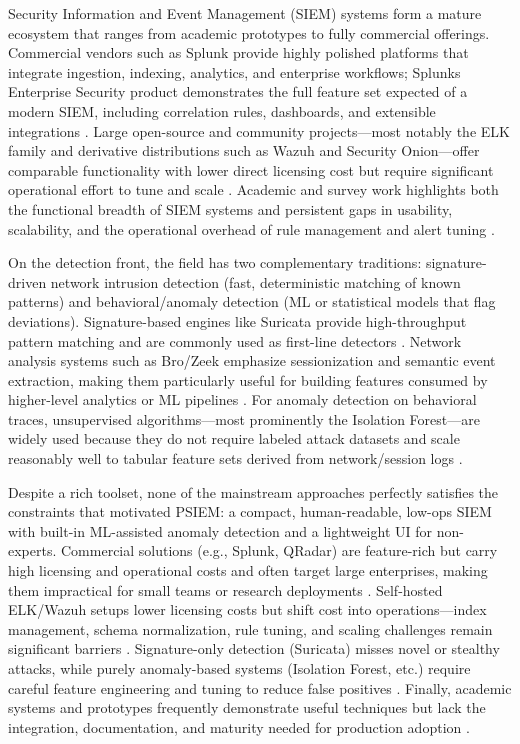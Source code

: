 Security Information and Event Management (SIEM) systems form a mature ecosystem that ranges from academic prototypes to fully commercial offerings. Commercial vendors such as Splunk provide highly polished platforms that integrate ingestion, indexing, analytics, and enterprise workflows; Splunks Enterprise Security product demonstrates the full feature set expected of a modern SIEM, including correlation rules, dashboards, and extensible integrations \cite{Splunk2017}. Large open-source and community projects—most notably the ELK family and derivative distributions such as Wazuh and Security Onion—offer comparable functionality with lower direct licensing cost but require significant operational effort to tune and scale \cite{WazuhWhitepaper2023}. Academic and survey work highlights both the functional breadth of SIEM systems and persistent gaps in usability, scalability, and the operational overhead of rule management and alert tuning \cite{Hase2024}.

On the detection front, the field has two complementary traditions: signature-driven network intrusion detection (fast, deterministic matching of known patterns) and behavioral/anomaly detection (ML or statistical models that flag deviations). Signature-based engines like Suricata provide high-throughput pattern matching and are commonly used as first-line detectors \cite{SuricataPerf2018}. Network analysis systems such as Bro/Zeek emphasize sessionization and semantic event extraction, making them particularly useful for building features consumed by higher-level analytics or ML pipelines \cite{Paxson1999}. For anomaly detection on behavioral traces, unsupervised algorithms—most prominently the Isolation Forest—are widely used because they do not require labeled attack datasets and scale reasonably well to tabular feature sets derived from network/session logs \cite{Liu2008}.

Despite a rich toolset, none of the mainstream approaches perfectly satisfies the constraints that motivated PSIEM: a compact, human-readable, low-ops SIEM with built-in ML-assisted anomaly detection and a lightweight UI for non-experts. Commercial solutions (e.g., Splunk, QRadar) are feature-rich but carry high licensing and operational costs and often target large enterprises, making them impractical for small teams or research deployments \cite{Splunk2017}. Self-hosted ELK/Wazuh setups lower licensing costs but shift cost into operations—index management, schema normalization, rule tuning, and scaling challenges remain significant barriers \cite{WazuhWhitepaper2023, Hase2024}. Signature-only detection (Suricata) misses novel or stealthy attacks, while purely anomaly-based systems (Isolation Forest, etc.) require careful feature engineering and tuning to reduce false positives \cite{SuricataPerf2018, Liu2008}. Finally, academic systems and prototypes frequently demonstrate useful techniques but lack the integration, documentation, and maturity needed for production adoption \cite{Hase2024}.

